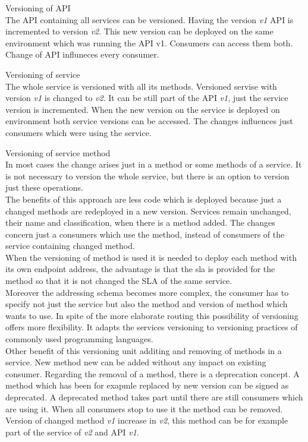\begin{description}
\item{Versioning of API} \\
The API containing all services can be versioned. Having the version \emph{v1} API is incremented to version \emph{v2}. This new version can be deployed on the same environment which was running the API v1. Consumers can access them both. Change of API influneces every consumer.
\item{Versioning of service} \\
  The whole service is versioned with all its methods. Versioned servise with version \emph{v1} is changed to \emph{v2}. It can be still part of the API \emph{v1}, just the service version is incremented. When the new version on the service is deployed on environment both service versions can be accessed. The changes influences just consumers which were using the service.
\item{Versioning of service method} \\
  In most cases the change arises just in a method or some methods of a service. It is not necessary to version the whole service, but there is an option to version just these operations. \\
  The benefits of this approach are less code which is deployed because just a changed methods are redeployed in a new version. Services remain unchanged, their name and classification, when there is a method added. The changes concern just a consumers which use the method, instead of consumers of the service containing changed method. \\
  When the versioning of method is used it is needed to deploy each method with its own endpoint address, the advantage is that the \gls{sla} is provided for the method so that it is not changed the SLA of the same service.\\
  Moreover the addressing schema becomes more complex, the consumer has to specify not just the service but also the method and version of method which wants to use.
  In spite of the more elaborate routing this possibility of versioning offers more flexibility. It adapts the services versioning to versioning practices of commonly used programming languages. \\
Other benefit of this versioning unit additing and removing of methods in a service. New method new can be added without any impact on existing consumer. Regarding the removal of a method, there is a deprecation concept. A method which has been for exapmle replaced by new version can be signed as deprecated. A deprecated method takes part until there are still consumers which are using it. When all consumers stop to use it the method can be removed.\\
  Version of changed method \emph{v1} increase in \emph{v2}, this method can be for example part of the service of \emph{v2} and API \emph{v1}.
\end{description}

